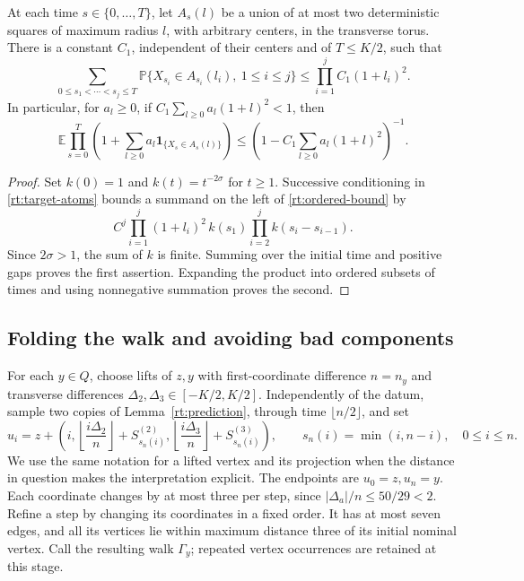 \begin{lemma}\label{rt:ordered}
At each time \(s\in\{0,\ldots,T\}\), let \(A_s(l)\) be a union of
at most two deterministic squares of maximum radius \(l\), with
arbitrary centers, in the transverse torus.  There is a constant
\(C_1\), independent of their centers and of \(T\le K/2\), such that
\begin{equation}\label{rt:ordered-bound}
 \sum_{0\le s_1<\cdots<s_j\le T}
 \mathbb P\{X_{s_i}\in A_{s_i}(l_i),\ 1\le i\le j\}
 \le \prod_{i=1}^jC_1(1+l_i)^2.
\end{equation}
In particular, for \(a_l\ge0\), if
\(C_1\sum_{l\ge0}a_l(1+l)^2<1\), then
\begin{equation}\label{rt:ordered-product}
 \mathbb E\prod_{s=0}^T
 \left(1+\sum_{l\ge0}a_l\mathbf1_{\{X_s\in A_s(l)\}}\right)
 \le \left(1-C_1\sum_{l\ge0}a_l(1+l)^2\right)^{-1}.
\end{equation}
\end{lemma}
\begin{proof}
Set \(k(0)=1\) and \(k(t)=t^{-2\sigma}\) for \(t\ge1\).
Successive conditioning in \eqref{rt:target-atoms} bounds a summand
on the left of \eqref{rt:ordered-bound} by
\[
 C^j\prod_{i=1}^j(1+l_i)^2\,
 k(s_1)\prod_{i=2}^j k(s_i-s_{i-1}).
\]
Since \(2\sigma>1\), the sum of \(k\) is finite.  Summing over the
initial time and positive gaps proves the first assertion.  Expanding
the product into ordered subsets of times and using nonnegative
summation proves the second.
\end{proof}

\subsection{Folding the walk and avoiding bad components}

For each \(y\in Q\), choose lifts of \(z,y\) with first-coordinate
difference \(n=n_y\) and transverse differences
\(\Delta_2,\Delta_3\in[-K/2,K/2]\).  Independently of the datum,
sample two copies of Lemma~\ref{rt:prediction}, through time
\(\lfloor n/2\rfloor\), and set
\begin{equation}\label{rt:nominal}
 u_i=z+\left(i,
       \left\lfloor\frac{i\Delta_2}{n}\right\rfloor
                         +S^{(2)}_{s_n(i)},
       \left\lfloor\frac{i\Delta_3}{n}\right\rfloor
                         +S^{(3)}_{s_n(i)}\right),\qquad
 s_n(i)=\min(i,n-i),\quad 0\le i\le n.
\end{equation}
We use the same notation for a lifted vertex and its projection when
the distance in question makes the interpretation explicit.  The
endpoints are \(u_0=z,u_n=y\).  Each coordinate changes by at most
three per step, since \(|\Delta_a|/n\le50/29<2\).  Refine a step by
changing its coordinates in a fixed order.  It has at most seven edges,
and all its vertices lie within maximum distance three of its initial
nominal vertex.  Call the resulting walk \(\Gamma_y\); repeated
vertex occurrences are retained at this stage.


